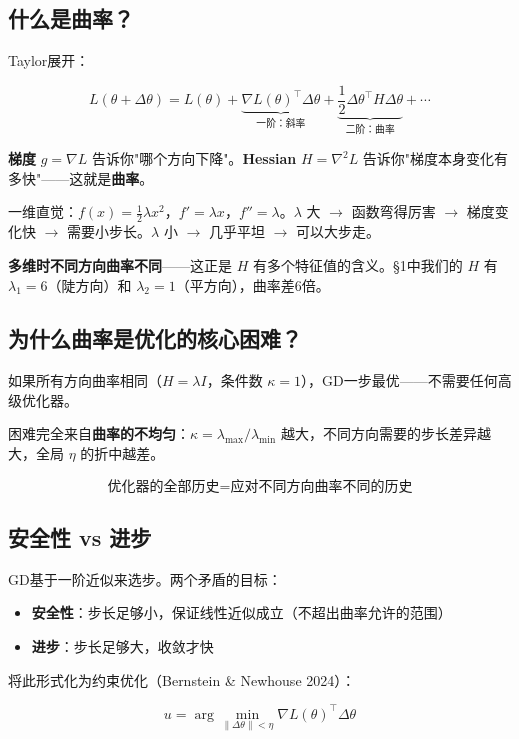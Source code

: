 \documentclass[12pt,a4paper]{article}
\begin{document}
\subsection{什么是曲率？}

Taylor展开：


\[L(\theta + \Delta\theta) = L(\theta) + \underbrace{\nabla L(\theta)^\top \Delta\theta}_{\text{一阶：斜率}} + \underbrace{\frac{1}{2}\Delta\theta^\top H \Delta\theta}_{\text{二阶：曲率}} + \cdots\]

\textbf{梯度} $g = \nabla L$ 告诉你"哪个方向下降"。\textbf{Hessian} $H = \nabla^2 L$ 告诉你"梯度本身变化有多快"——这就是\textbf{曲率}。

一维直觉：$f(x) = \frac{1}{2}\lambda x^2$，$f' = \lambda x$，$f'' = \lambda$。$\lambda$ 大 $\to$ 函数弯得厉害 $\to$ 梯度变化快 $\to$ 需要小步长。$\lambda$ 小 $\to$ 几乎平坦 $\to$ 可以大步走。

\textbf{多维时不同方向曲率不同}——这正是 $H$ 有多个特征值的含义。§1中我们的 $H$ 有 $\lambda_1 = 6$（陡方向）和 $\lambda_2 = 1$（平方向），曲率差6倍。


\subsection{为什么曲率是优化的核心困难？}

如果所有方向曲率相同（$H = \lambda I$，条件数 $\kappa = 1$），GD一步最优——不需要任何高级优化器。

困难完全来自\textbf{曲率的不均匀}：$\kappa = \lambda_{\max}/\lambda_{\min}$ 越大，不同方向需要的步长差异越大，全局 $\eta$ 的折中越差。


\[\text{优化器的全部历史} = \text{应对不同方向曲率不同的历史}\]


\subsection{安全性 vs 进步}

GD基于一阶近似来选步。两个矛盾的目标：

\begin{itemize}[leftmargin=*,nosep]
\item \textbf{安全性}：步长足够小，保证线性近似成立（不超出曲率允许的范围）
\item \textbf{进步}：步长足够大，收敛才快
\end{itemize}


将此形式化为约束优化（Bernstein \& Newhouse 2024）：


\[u = \arg\min_{\|\Delta\theta\| < \eta} \nabla L(\theta)^\top \Delta\theta\]
\end{document}
